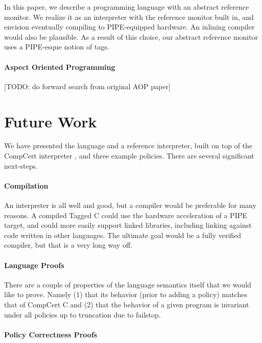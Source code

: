 \documentclass{llncs}
\begin{document}
In this paper, we describe a programming language with an abstract reference monitor.
We realize it as an interpreter with the reference monitor built in, and envision
eventually compiling to PIPE-equipped hardware. An inlining compiler would also be plausible.
As a result of this choice, our abstract reference monitor uses a PIPE-esque notion of
tags.

\paragraph{Aspect Oriented Programming}

[TODO: do forward search from original AOP paper]

\section{Future Work}
\label{sec:futurework}

We have presented the language and a reference interpreter, built on top of the CompCert interpreter
\cite{Leroy09:CompCert}, and three example policies. There are several significant next-steps.

\paragraph{Compilation}

An interpreter is all well and good, but a compiler would be preferable for many reasons.
A compiled Tagged C could use the hardware acceleration of a PIPE target, and could more easily
support linked libraries, including linking against code written in other languages.
The ultimate goal would be a fully verified compiler, but that is a very long way off.

\paragraph{Language Proofs}

There are a couple of properties of the language semantics itself that we would like to prove.
Namely (1) that its behavior (prior to adding a policy) matches that of CompCert C and
(2) that the behavior of a given program is invariant under all policies up to truncation due
to failstop.

\paragraph{Policy Correctness Proofs}
\end{document}
